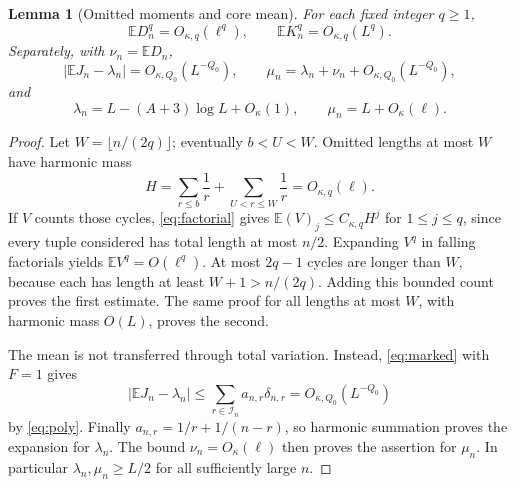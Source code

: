 \documentclass[11pt]{article}
\newcommand{\E}{\mathbb E}
\newtheorem{lemma}[theorem]{Lemma}
\theoremstyle{remark}
\begin{document}
\begin{lemma}[Omitted moments and core mean]\label{lem:moments}
For each fixed integer $q\ge1$,
\begin{equation}\label{eq:moment-bounds}
 \E D_n^q=O_{\kappa,q}(\ell^q),\qquad \E K_n^q=O_{\kappa,q}(L^q).
\end{equation}
Separately, with $\nu_n=\E D_n$,
\begin{equation}\label{eq:mean-error}
 |\E J_n-\lambda_n|=O_{\kappa,Q_0}(L^{-Q_0}),\qquad
 \mu_n=\lambda_n+\nu_n+O_{\kappa,Q_0}(L^{-Q_0}),
\end{equation}
and
\begin{equation}\label{eq:lambda}
 \lambda_n=L-(A+3)\log L+O_\kappa(1),\qquad
 \mu_n=L+O_\kappa(\ell).
\end{equation}
\end{lemma}
\begin{proof}
Let $W=\lfloor n/(2q)\rfloor$; eventually $b<U<W$. Omitted lengths at most $W$ have harmonic mass
\[
 H=\sum_{r\le b}\frac1r+\sum_{U<r\le W}\frac1r=O_{\kappa,q}(\ell).
\]
If $V$ counts those cycles, \eqref{eq:factorial} gives $\E(V)_j\le C_{\kappa,q}H^j$ for $1\le j\le q$, since every tuple considered has total length at most $n/2$. Expanding $V^q$ in falling factorials yields $\E V^q=O(\ell^q)$. At most $2q-1$ cycles are longer than $W$, because each has length at least $W+1>n/(2q)$. Adding this bounded count proves the first estimate. The same proof for all lengths at most $W$, with harmonic mass $O(L)$, proves the second.

The mean is not transferred through total variation. Instead, \eqref{eq:marked} with $F=1$ gives
\[
 |\E J_n-\lambda_n|\le\sum_{r\in\mathcal I_n}a_{n,r}\delta_{n,r}
 =O_{\kappa,Q_0}(L^{-Q_0})
\]
by \eqref{eq:poly}. Finally $a_{n,r}=1/r+1/(n-r)$, so harmonic summation proves the expansion for $\lambda_n$. The bound $\nu_n=O_\kappa(\ell)$ then proves the assertion for $\mu_n$. In particular $\lambda_n,\mu_n\ge L/2$ for all sufficiently large $n$.
\end{proof}
\end{document}
